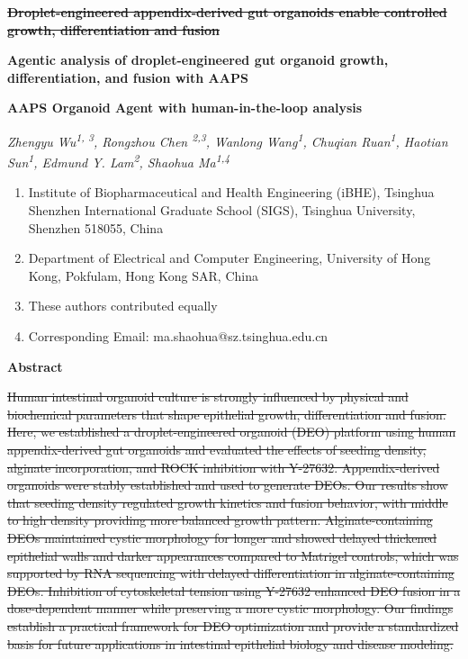 \documentclass[
]{article}
\author{}
\date{}
\begin{document}
\textbf{\sout{Droplet-engineered appendix-derived gut organoids enable controlled growth, differentiation and fusion}}

\textbf{Agentic analysis of droplet-engineered gut organoid growth, differentiation, and fusion with AAPS}

\textbf{AAPS Organoid Agent with human-in-the-loop analysis}

\emph{Zhengyu Wu\textsuperscript{1, 3}, Rongzhou Chen \textsuperscript{2,3}, Wanlong Wang\textsuperscript{1}, Chuqian Ruan\textsuperscript{1}, Haotian Sun\textsuperscript{1}, Edmund Y. Lam\textsuperscript{2}, Shaohua Ma\textsuperscript{1,4}}

\begin{enumerate}
\def\labelenumi{\arabic{enumi}.}
\item
  Institute of Biopharmaceutical and Health Engineering (iBHE), Tsinghua Shenzhen International Graduate School (SIGS), Tsinghua University, Shenzhen 518055, China
\item
  Department of Electrical and Computer Engineering, University of Hong Kong, Pokfulam, Hong Kong SAR, China
\item
  These authors contributed equally
\item
  Corresponding Email: ma.shaohua@sz.tsinghua.edu.cn
\end{enumerate}

\textbf{Abstract}

\sout{Human intestinal organoid culture is strongly influenced by physical and biochemical parameters that shape epithelial growth, differentiation and fusion. Here, we established a droplet-engineered organoid (DEO) platform using human appendix-derived gut organoids and evaluated the effects of seeding density, alginate incorporation, and ROCK inhibition with Y-27632. Appendix-derived organoids were stably established and used to generate DEOs. Our results show that seeding density regulated growth kinetics and fusion behavior, with middle to high density providing more balanced growth pattern. Alginate-containing DEOs maintained cystic morphology for longer and showed delayed thickened epithelial walls and darker appearances compared to Matrigel controls, which was supported by RNA sequencing with delayed differentiation in alginate-containing DEOs. Inhibition of cytoskeletal tension using Y-27632 enhanced DEO fusion in a dose-dependent manner while preserving a more cystic morphology. Our findings establish a practical framework for DEO optimization and provide a standardized basis for future applications in intestinal epithelial biology and disease modeling.}
\end{document}
